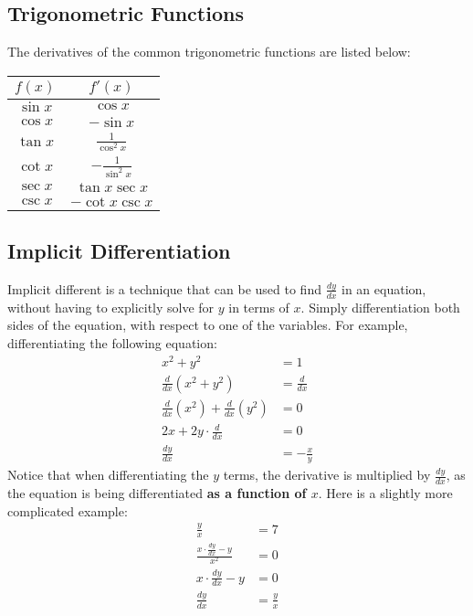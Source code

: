 \subsection{Trigonometric Functions}
\label{sec:deriv_trig_funcs}
The derivatives of the common trigonometric functions are listed below:
\begin{center}
	\begin{tabular}{|c|c|}
		\hline
		$f(x)$ & $f'(x)$ \\
		\hline \hline
		$\sin{x}$ & $\cos{x}$ \\
		\hline
		$\cos{x}$ & $-\sin{x}$ \\
		\hline
		$\tan{x}$ & $\frac{1}{\cos^2{x}}$ \\
		\hline \hline
		$\cot{x}$ & $-\frac{1}{\sin^2{x}}$ \\
		\hline
		$\sec{x}$ & $\tan{x} \sec{x}$ \\
		\hline
		$\csc{x}$ & $-\cot{x} \csc{x}$ \\
		\hline
	\end{tabular}
\end{center}

\subsection{Implicit Differentiation}
Implicit different is a technique that can be used to find $\frac{dy}{dx}$ in an equation, without having to explicitly solve for $y$ in terms of $x$. Simply differentiation both sides of the equation, with respect to one of the variables. For example, differentiating the following equation:
\begin{align*}
	x^2 + y^2 &= 1 \\
	\frac{d}{dx} (x^2 + y^2) &= \frac{d}{dx} \\[5pt]
	\frac{d}{dx} (x^2) + \frac{d}{dx} (y^2) &= 0 \\[5pt]
	2x + 2y \cdot \frac{d}{dx} &= 0 \\[5pt]
	\frac{dy}{dx} &= -\frac{x}{y}
\end{align*}
Notice that when differentiating the $y$ terms, the derivative is multiplied by $\frac{dy}{dx}$, as the equation is being differentiated \textbf{as a function of $x$}. Here is a slightly more complicated example:
\begin{align*}
	\frac{y}{x} &= 7 \\[5pt]
	\frac{x \cdot \frac{dy}{dx} - y}{x^2} &= 0 \\[5pt]
	x \cdot \frac{dy}{dx} - y &= 0 \\[5pt]
	\frac{dy}{dx} &= \frac{y}{x}
\end{align*}

